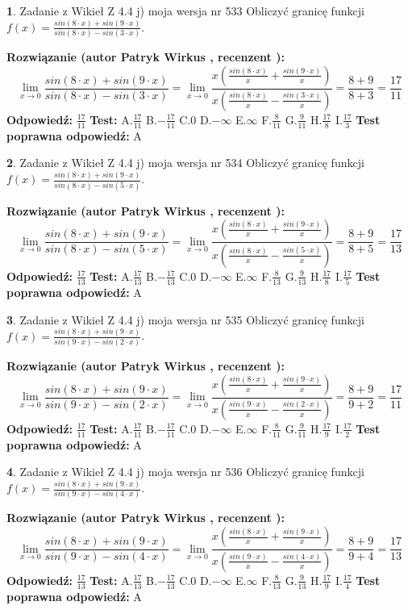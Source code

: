 \documentclass[12pt, a4paper]{article}
\theoremstyle{definition} %
\newtheorem{zad}{}
\newcommand{\zadStart}[1]{\begin{zad}#1\newline}
\newcommand{\zadStop}{\end{zad}}
\newcommand{\rozwStart}[2]{\noindent \textbf{Rozwiązanie (autor #1 , recenzent #2): }\newline}
\newcommand{\rozwStop}{\newline}
\newcommand{\odpStart}{\noindent \textbf{Odpowiedź:}\newline}
\newcommand{\odpStop}{\newline}
\newcommand{\testStart}{\noindent \textbf{Test:}\newline}
\newcommand{\testStop}{\newline}
\newcommand{\kluczStart}{\noindent \textbf{Test poprawna odpowiedź:}\newline}
\newcommand{\kluczStop}{\newline}
\begin{document}
\zadStart{Zadanie z Wikieł Z 4.4 j) moja wersja nr 533}
Obliczyć granicę funkcji $f(x)=\frac{sin(8\cdot x) +sin(9\cdot x)}{sin(8\cdot x) -sin(3\cdot x)}$.
\zadStop
\rozwStart{Patryk Wirkus}{}
$$\lim\limits_{x\to 0}\frac{sin(8\cdot x) +sin(9\cdot x)}{sin(8\cdot x) -sin(3\cdot x)}=\lim\limits_{x\to 0}\frac{x(\frac{sin(8\cdot x)}{x}+\frac{sin(9\cdot x)}{x})}{x(\frac{sin(8\cdot x)}{x}-\frac{sin(3\cdot x)}{x})}=\frac{8+9}{8+3} = \frac{17}{11}$$
\rozwStop
\odpStart
$\frac{17}{11}$
\odpStop
\testStart
A.$\frac{17}{11}$
B.$-\frac{17}{11}$
C.$0$
D.$-\infty$
E.$\infty$
F.$\frac{8}{11}$
G.$\frac{9}{11}$
H.$\frac{17}{8}$
I.$\frac{17}{3}$
\testStop
\kluczStart
A
\kluczStop



\zadStart{Zadanie z Wikieł Z 4.4 j) moja wersja nr 534}
Obliczyć granicę funkcji $f(x)=\frac{sin(8\cdot x) +sin(9\cdot x)}{sin(8\cdot x) -sin(5\cdot x)}$.
\zadStop
\rozwStart{Patryk Wirkus}{}
$$\lim\limits_{x\to 0}\frac{sin(8\cdot x) +sin(9\cdot x)}{sin(8\cdot x) -sin(5\cdot x)}=\lim\limits_{x\to 0}\frac{x(\frac{sin(8\cdot x)}{x}+\frac{sin(9\cdot x)}{x})}{x(\frac{sin(8\cdot x)}{x}-\frac{sin(5\cdot x)}{x})}=\frac{8+9}{8+5} = \frac{17}{13}$$
\rozwStop
\odpStart
$\frac{17}{13}$
\odpStop
\testStart
A.$\frac{17}{13}$
B.$-\frac{17}{13}$
C.$0$
D.$-\infty$
E.$\infty$
F.$\frac{8}{13}$
G.$\frac{9}{13}$
H.$\frac{17}{8}$
I.$\frac{17}{5}$
\testStop
\kluczStart
A
\kluczStop



\zadStart{Zadanie z Wikieł Z 4.4 j) moja wersja nr 535}
Obliczyć granicę funkcji $f(x)=\frac{sin(8\cdot x) +sin(9\cdot x)}{sin(9\cdot x) -sin(2\cdot x)}$.
\zadStop
\rozwStart{Patryk Wirkus}{}
$$\lim\limits_{x\to 0}\frac{sin(8\cdot x) +sin(9\cdot x)}{sin(9\cdot x) -sin(2\cdot x)}=\lim\limits_{x\to 0}\frac{x(\frac{sin(8\cdot x)}{x}+\frac{sin(9\cdot x)}{x})}{x(\frac{sin(9\cdot x)}{x}-\frac{sin(2\cdot x)}{x})}=\frac{8+9}{9+2} = \frac{17}{11}$$
\rozwStop
\odpStart
$\frac{17}{11}$
\odpStop
\testStart
A.$\frac{17}{11}$
B.$-\frac{17}{11}$
C.$0$
D.$-\infty$
E.$\infty$
F.$\frac{8}{11}$
G.$\frac{9}{11}$
H.$\frac{17}{9}$
I.$\frac{17}{2}$
\testStop
\kluczStart
A
\kluczStop



\zadStart{Zadanie z Wikieł Z 4.4 j) moja wersja nr 536}
Obliczyć granicę funkcji $f(x)=\frac{sin(8\cdot x) +sin(9\cdot x)}{sin(9\cdot x) -sin(4\cdot x)}$.
\zadStop
\rozwStart{Patryk Wirkus}{}
$$\lim\limits_{x\to 0}\frac{sin(8\cdot x) +sin(9\cdot x)}{sin(9\cdot x) -sin(4\cdot x)}=\lim\limits_{x\to 0}\frac{x(\frac{sin(8\cdot x)}{x}+\frac{sin(9\cdot x)}{x})}{x(\frac{sin(9\cdot x)}{x}-\frac{sin(4\cdot x)}{x})}=\frac{8+9}{9+4} = \frac{17}{13}$$
\rozwStop
\odpStart
$\frac{17}{13}$
\odpStop
\testStart
A.$\frac{17}{13}$
B.$-\frac{17}{13}$
C.$0$
D.$-\infty$
E.$\infty$
F.$\frac{8}{13}$
G.$\frac{9}{13}$
H.$\frac{17}{9}$
I.$\frac{17}{4}$
\testStop
\kluczStart
A
\kluczStop
\end{document}
